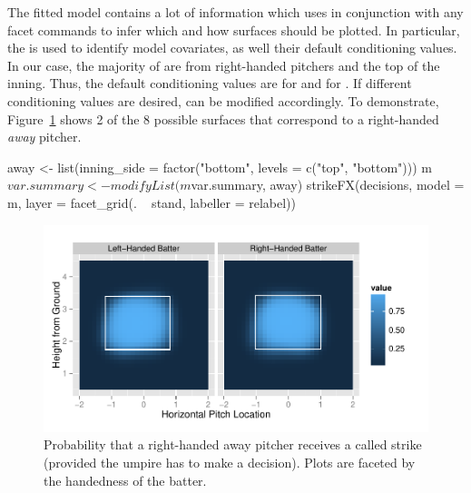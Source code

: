 \begin{article}
The fitted model  contains a lot of information which 
uses in conjunction with any  facet commands to infer
which and how surfaces should be plotted. In particular, the 
is used to identify model covariates, as well their default conditioning
values. In our case, the majority of  are from right-handed
pitchers and the top of the inning. Thus, the default conditioning
values are  for  and 
for . If different conditioning values are desired,
 can be modified accordingly. To demonstrate, Figure~\ref{fig:strike-probs}
shows 2 of the 8 possible surfaces that correspond to a right-handed
\emph{away} pitcher.
%
\begin{Schunk}
\begin{Sinput}
away <- list(inning_side = factor("bottom", levels = c("top", "bottom")))
m$var.summary <- modifyList(m$var.summary, away)
strikeFX(decisions, model = m, layer = facet_grid(. ~ stand, labeller = relabel))
\end{Sinput}
\end{Schunk}
%

\begin{figure}[h]
\centerline{\includegraphics[scale = 1]{prob-strike.pdf}}

\caption{\label{fig:strike-probs}Probability that a right-handed away pitcher
receives a called strike (provided the umpire has to make a decision).
Plots are faceted by the handedness of the batter.}
\end{figure}



\end{article}
